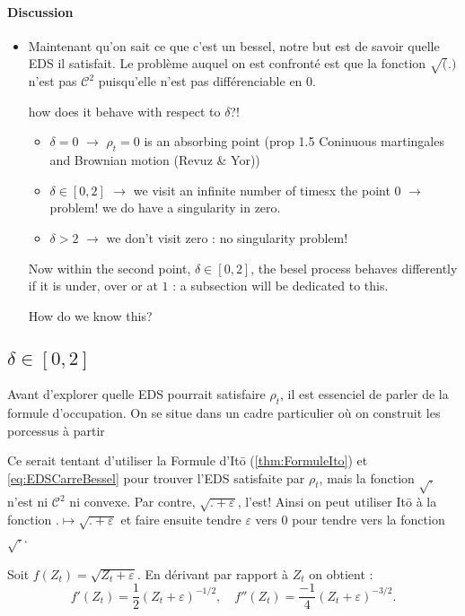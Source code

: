 \documentclass[openany]{book}
\newcommand{\1}{\mathbbm{1}}
\theoremstyle{thmfont}
\theoremstyle{deffont}
\theoremstyle{thmfont}
\theoremstyle{deffont}
\begin{document}
\paragraph{Discussion}
\begin{itemize}
  \item[]
    Maintenant qu'on sait ce que c'est un bessel, notre but est de savoir quelle EDS il satisfait. Le problème auquel on est confronté est que la fonction $\sqrt(.)$ n'est pas $\mathcal C^2$ puisqu'elle n'est pas différenciable en 0.


\newpage    

{\color{red} how does it behave with respect to $\delta$?!
  \begin{itemize}
  \item $\delta = 0$ $\rightarrow$ $\rho_t = 0$ is an absorbing point (prop 1.5 Coninuous martingales and Brownian motion (Revuz \& Yor))
  \item $\delta \in [0,2]$ $\rightarrow$ we visit an infinite number of timesx the point 0 $\rightarrow$ problem! we do have a singularity in zero.
  \item $\delta > 2$ $\rightarrow$ we don't visit zero : no singularity problem!
  \end{itemize}
  Now within the second point, $\delta \in [0,2]$, the besel process behaves differently if it is under, over or at $1$ : a subsection will be dedicated to this.

  How do we know this?}
\end{itemize}
\subsection{$\delta \in [0,2]$}

Avant d'explorer quelle EDS pourrait satisfaire $\rho_t$, il est essenciel de parler de la formule d'occupation. On se situe dans un cadre particulier où on construit les porcessus à partir 


Ce serait tentant d'utiliser la Formule d'Itō (\autoref{thm:FormuleIto}) et \eqref{eq:EDSCarreBessel} pour trouver l'EDS satisfaite par $\rho_t$, mais la fonction $\sqrt{.}$ n'est ni $\mathcal C^2$ ni convexe. Par contre, $\sqrt{.+\varepsilon}$, l'est! Ainsi on peut utiliser Itō à la fonction $.\mapsto\sqrt{.+\varepsilon}$ et faire ensuite tendre $\varepsilon$ vers $0$ pour tendre vers la fonction $\sqrt{.}$.


Soit $f(Z_t) = \sqrt{Z_t + \varepsilon}$. En dérivant par rapport à $Z_t$ on obtient : $$f'(Z_t) = \dfrac{1}{2} (Z_t + \varepsilon)^{-1/2},\quad f''(Z_t) = \dfrac{-1}{4} (Z_t + \varepsilon)^{-3/2}.$$ 
\end{document}
